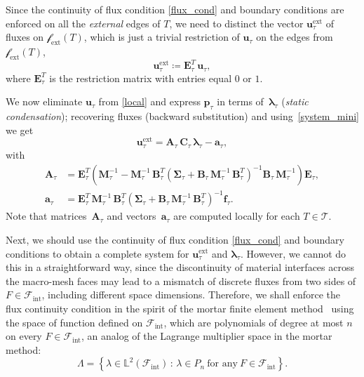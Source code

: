 \documentclass[12pt]{article}
\newcommand{\vect}[1]{\boldsymbol{\mathbf{#1}}}
\newcommand{\bmesh}{{\vect{\mathcal T}}}
\newcommand{\mmesh}{{\vect{\mathcal \tau}}}
\newcommand{\bfaces}[1][]{{\vect{\mathcal F}_{\text{#1}}}}
\newcommand{\mfaces}[1][]{{\vect{\mathcal f}_{\text{#1}}}}
\newcommand{\LTwoSpace}[1][\Omega]{{\mathbb L^2\left({#1}\right)}}
\begin{document}
	Since the continuity of flux condition \eqref{flux_cond} and boundary conditions are enforced on all the \emph{external} edges of $T$, we need to distinct the vector ${\vect u}^\text{ext}_\mmesh$ of fluxes on $\mfaces[ext](T)$, which is just a trivial restriction of ${\vect u}_\mmesh$ on the edges  from $\mfaces[ext](T)$,
	\begin{equation}\label{system_mini}
		{\vect u}^\text{ext}_\mmesh \coloneqq \vect E_\mmesh^T\,{\vect u}_\mmesh,
	\end{equation}
	where $\vect E_\mmesh^T$ is the restriction matrix with entries equal $0$ or $1$.
	
	We now eliminate ${\vect u}_\mmesh$ from \eqref{local} and express ${\vect p}_\mmesh$ in terms of~${\vect \lambda}_\mmesh$ (\textit{static condensation}); recovering fluxes (backward substitution) and using~\eqref{system_mini} we get
	\begin{equation}\label{mini_flux_dofs}
		{\vect u}^\text{ext}_\mmesh = \vect A_\mmesh\,\vect C_\mmesh\,{\vect \lambda}_\mmesh - {\vect a}_\mmesh,
	\end{equation}
	with
	\begin{align} \label{defA}
		\vect A_\mmesh &= \vect E^T_\mmesh \left( \vect M^{-1}_\mmesh - \vect M^{-1}_\mmesh\,\vect B^T_\mmesh \left( \vect \Sigma_\mmesh + \vect B_\mmesh\,\vect M^{-1}_\mmesh\,\vect B^{T}_\mmesh\right)^{-1} \vect B_\mmesh\,\vect M^{-1}_\mmesh \right) \vect E_\mmesh, \\
		{\vect a}_\mmesh &= \vect E^{T}_\mmesh\,\vect M^{-1}_\mmesh\,\vect B^T_\mmesh \left( \vect \Sigma_\mmesh + \vect B_\mmesh\,\vect M^{-1}_\mmesh\,\vect B^{T}_\mmesh\right)^{-1} {\vect f}_\mmesh.
	\end{align}
	Note that matrices~$\vect A_\mmesh$ and vectors~${\vect a}_\mmesh$ are computed locally for each $T\in\bmesh$.
	\smallskip
	
	Next, we should use the continuity of flux condition \eqref{flux_cond} and boundary conditions to obtain a complete system for ${\vect u}^\text{ext}_\mmesh$ and ${\vect \lambda}_\mmesh$. However, we cannot do this in a straightforward way, since the discontinuity of material interfaces across the macro-mesh faces may lead to a mismatch of discrete fluxes from two sides of $F\in\bfaces[int]$, including different space dimensions.
	Therefore, we shall enforce the flux continuity condition in the spirit of the mortar finite element method~\cite{mortar} using the space of function defined on $\bfaces[int]$, which are polynomials of degree at most $n$ on every $F\in\bfaces[int]$, an analog of the Lagrange multiplier space in the mortar method:
	\[
		\Lambda=\left\{\lambda\in \LTwoSpace[{\bfaces[int]}]\,:\, \lambda\in P_n~\text{for any}~F\in\bfaces[int]\right\}.
	\]
	
\end{document}
